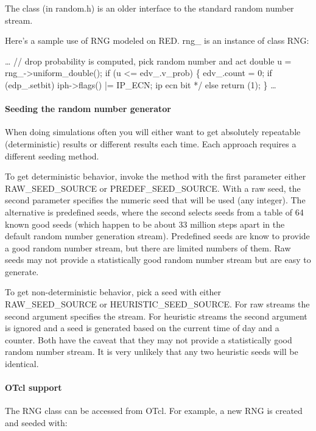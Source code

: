 The  class (in random.h) is an older interface to the standard
random number stream.

Here's a sample use of RNG modeled on RED.  rng\_ is an instance of class RNG:
\begin{program}
        \ldots
        // {\cf drop probability is computed, pick random number and act}
        double u = rng_->uniform_double();
        if (u <= edv_.v_prob) \{
                edv_.count = 0;
                if (edp_.setbit) 
                        iph->flags() |= IP_ECN; \* ip ecn bit */
                else
                        return (1);
        \}
        \ldots
\end{program}

\paragraph{Seeding the random number generator}
When doing simulations often you will either want to get absolutely
repeatable (deterministic) results or different results each time.
Each approach requires a different seeding method.

To get deterministic behavior, invoke the  method
with the first parameter either RAW\_SEED\_SOURCE or
PREDEF\_SEED\_SOURCE.  With a raw seed, the second parameter specifies
the numeric seed that will be used (any integer).  The alternative is
predefined seeds, where the second selects seeds from a table of 64
known good seeds (which happen to be about 33 million steps apart in
the default random number generation stream).
Predefined seeds are know to provide a good random number stream,
but there are limited numbers of them.
Raw seeds may
not provide a statistically good random number stream but are easy to generate.

To get non-deterministic behavior, pick a seed with either 
RAW\_SEED\_SOURCE or HEURISTIC\_SEED\_SOURCE.
For raw streams the second argument specifies the stream.
For heuristic streams the second argument is ignored and a seed is generated
based on the current time of day and a counter.
Both have the caveat that they may not provide a
statistically good random number stream.
It is very unlikely that any two heuristic seeds will be identical.

\paragraph{OTcl support}
The RNG class can be accessed from OTcl.  For example, a new RNG is
created and seeded with:

